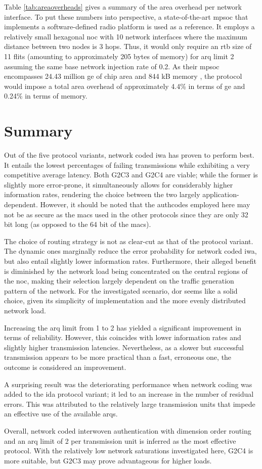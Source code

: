 Table \vref{tab:areaoverheads} gives a summary of the area overhead per network interface. To put these numbers into perspective, a state-of-the-art
\gls{mpsoc} that implements a software-defined radio platform \cite{haas18sdrmpsoc} is used as a reference. It employs a relatively small hexagonal
\gls{noc} with 10 network interfaces where the maximum distance between two nodes is 3 hops. Thus, it would only require an \gls{rtb} size of 11 flits
(amounting to approximately 205 bytes of memory) for \gls{arq} limit 2 assuming the same base network injection rate of 0.2. As their \gls{mpsoc} encompasses 24.43
million \gls{ge} of chip area and 844 kB memory \cite[4]{haas18sdrmpsoc}, the protocol would impose a total area overhead of approximately 4.4\% in
terms of \gls{ge} and 0.24\% in terms of memory.

\section{Summary}\label{sec:summaryeval}
Out of the five protocol variants, network coded \gls{iwa} has proven to perform best. It entails the lowest percentages of failing
transmissions while exhibiting a very competitive average latency. Both G2C3 and G2C4 are viable; while the former is slightly more error-prone, it
simultaneously allows for considerably higher information rates, rendering the choice between the two largely application-dependent. However, it
should be noted that the authcodes employed here may not be as secure as the \glspl{mac} used in the other protocols since they are only 32 bit long
(as opposed to the 64 bit of the \glspl{mac}).

The choice of routing strategy is not as clear-cut as that of the protocol variant. The dynamic ones marginally reduce the error probability for
network coded \gls{iwa}, but also entail slightly lower information rates. Furthermore, their alleged benefit is diminished by the network load being
concentrated on the central regions of the \gls{noc}, making their selection largely dependent on the traffic generation pattern of the network. For the
investigated scenario, \gls{dor} seems like a solid choice, given its simplicity of implementation and the more evenly distributed network load.

Increasing the \gls{arq} limit from 1 to 2 has yielded a significant improvement in terms of reliability. However, this coincides with lower
information rates and slightly higher transmission latencies. Nevertheless, as a slower but successful transmission appears to be more practical than
a fast, erroneous one, the outcome is considered an improvement.

A surprising result was the deteriorating performance when network coding was added to the \gls{ida} protocol variant; it led to an increase in the
number of residual errors. This was attributed to the relatively large transmission units that impede an effective use of the available \glspl{arq}.

Overall, network coded interwoven authentication with dimension order routing and an \gls{arq} limit of 2 per transmission unit is inferred as the
most effective protocol. With the relatively low network saturations investigated here, G2C4 is more suitable, but G2C3 may prove advantageous for
higher loads.
